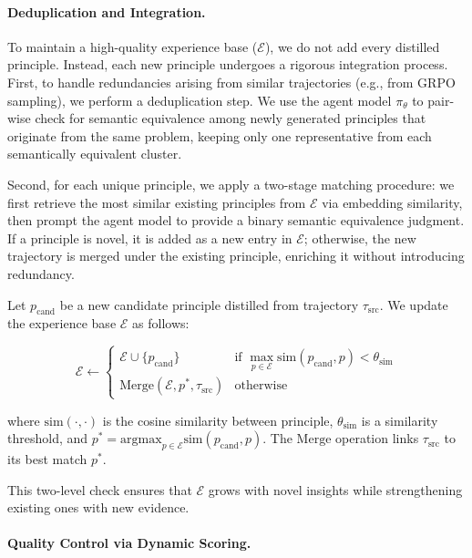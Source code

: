 \paragraph{Deduplication and Integration.}
To maintain a high-quality experience base ($\mathcal{E}$), we do not add every distilled principle. Instead, each new principle undergoes a rigorous integration process. First, to handle redundancies arising from similar trajectories (e.g., from GRPO sampling), we perform a deduplication step. We use the agent model $\pi_\theta$ to pair-wise check for semantic equivalence among newly generated principles that originate from the same problem, keeping only one representative from each semantically equivalent cluster. 

Second, for each unique principle, we apply a two-stage matching procedure: we first retrieve the most similar existing principles from $\mathcal{E}$ via embedding similarity, then prompt the agent model to provide a binary semantic equivalence judgment.
If a principle is novel, it is added as a new entry in $\mathcal{E}$; otherwise, the new trajectory is merged under the existing principle, enriching it without introducing redundancy.

Let $p_{\text{cand}}$ be a new candidate principle distilled from trajectory $\tau_{\text{src}}$. We update the experience base $\mathcal{E}$ as follows:

\begin{equation}
\mathcal{E} \leftarrow 
\begin{cases} 
    \mathcal{E} \cup \{p_{\text{cand}}\} & \text{if } \max_{p \in \mathcal{E}} \text{sim}(p_{\text{cand}}, p) < \theta_{\text{sim}} \\
    \text{Merge}(\mathcal{E}, p^*, \tau_{\text{src}}) & \text{otherwise}
\end{cases}
\label{eq:merge_create_concise}
\end{equation}

where $\text{sim}(\cdot, \cdot)$ is the cosine similarity between principle, $\theta_{\text{sim}}$ is a similarity threshold, and $p^* = \text{argmax}_{p \in \mathcal{E}} \text{sim}(p_{\text{cand}}, p)$. The $\text{Merge}$ operation links $\tau_{\text{src}}$ to its best match $p^*$.

This two-level check ensures that $\mathcal{E}$ grows with novel insights while strengthening existing ones with new evidence.

\paragraph{Quality Control via Dynamic Scoring.}

